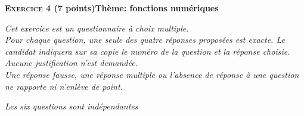 \documentclass[10pt,a4paper]{article}
\begin{document}
\bigskip

\textbf{\textsc{Exercice 4} (7 points)\hfill Thème: fonctions numériques}

\medskip

\emph{Cet exercice est un questionnaire à choix multiple.\\
Pour chaque question, une seule des quatre réponses proposées est exacte. Le candidat indiquera sur sa copie le numéro de la question et la réponse choisie. \\
Aucune justification n'est demandée.\\
Une réponse fausse, une réponse multiple ou l'absence de réponse à une question ne rapporte ni n'enlève de point.}

\emph{Les six questions sont indépendantes}

\medskip
\end{document}
